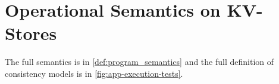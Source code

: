 \section{Operational Semantics on KV-Stores}
\label{sec:full-semantics}

The full semantics is in \cref{def:program_semantics} and the full definition of consistency models is in  \cref{fig:app-execution-tests}.




